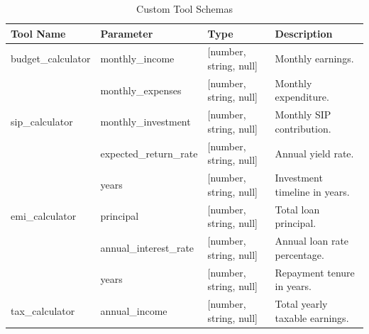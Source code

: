 \begin{table}[H]
    \centering
    \caption{Custom Tool Schemas}
    \label{table:tool_schemas}
    \begin{tabular}{lllp{6cm}}
        \toprule
        \textbf{Tool Name} & \textbf{Parameter} & \textbf{Type} & \textbf{Description} \\
        \midrule
        budget\_calculator & monthly\_income & [number, string, null] & Monthly earnings. \\
        & monthly\_expenses & [number, string, null] & Monthly expenditure. \\
        \midrule
        sip\_calculator & monthly\_investment & [number, string, null] & Monthly SIP contribution. \\
        & expected\_return\_rate & [number, string, null] & Annual yield rate. \\
        & years & [number, string, null] & Investment timeline in years. \\
        \midrule
        emi\_calculator & principal & [number, string, null] & Total loan principal. \\
        & annual\_interest\_rate & [number, string, null] & Annual loan rate percentage. \\
        & years & [number, string, null] & Repayment tenure in years. \\
        \midrule
        tax\_calculator & annual\_income & [number, string, null] & Total yearly taxable earnings. \\
        \bottomrule
    \end{tabular}
\end{table}

